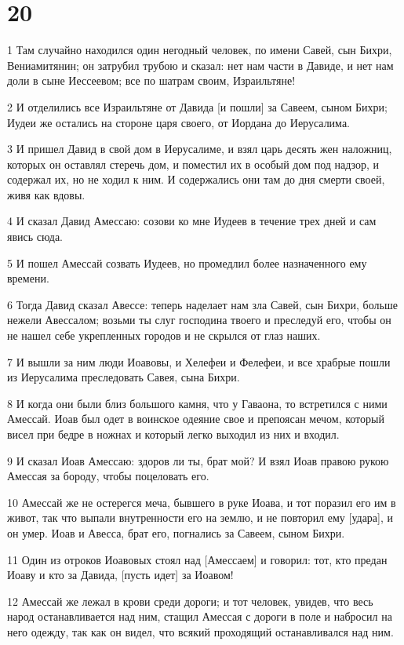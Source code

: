 \chapter{20}

\par 1 Там случайно находился один негодный человек, по имени Савей, сын Бихри, Вениамитянин; он затрубил трубою и сказал: нет нам части в Давиде, и нет нам доли в сыне Иессеевом; все по шатрам своим, Израильтяне!
\par 2 И отделились все Израильтяне от Давида [и пошли] за Савеем, сыном Бихри; Иудеи же остались на стороне царя своего, от Иордана до Иерусалима.
\par 3 И пришел Давид в свой дом в Иерусалиме, и взял царь десять жен наложниц, которых он оставлял стеречь дом, и поместил их в особый дом под надзор, и содержал их, но не ходил к ним. И содержались они там до дня смерти своей, живя как вдовы.
\par 4 И сказал Давид Амессаю: созови ко мне Иудеев в течение трех дней и сам явись сюда.
\par 5 И пошел Амессай созвать Иудеев, но промедлил более назначенного ему времени.
\par 6 Тогда Давид сказал Авессе: теперь наделает нам зла Савей, сын Бихри, больше нежели Авессалом; возьми ты слуг господина твоего и преследуй его, чтобы он не нашел себе укрепленных городов и не скрылся от глаз наших.
\par 7 И вышли за ним люди Иоавовы, и Хелефеи и Фелефеи, и все храбрые пошли из Иерусалима преследовать Савея, сына Бихри.
\par 8 И когда они были близ большого камня, что у Гаваона, то встретился с ними Амессай. Иоав был одет в воинское одеяние свое и препоясан мечом, который висел при бедре в ножнах и который легко выходил из них и входил.
\par 9 И сказал Иоав Амессаю: здоров ли ты, брат мой? И взял Иоав правою рукою Амессая за бороду, чтобы поцеловать его.
\par 10 Амессай же не остерегся меча, бывшего в руке Иоава, и тот поразил его им в живот, так что выпали внутренности его на землю, и не повторил ему [удара], и он умер. Иоав и Авесса, брат его, погнались за Савеем, сыном Бихри.
\par 11 Один из отроков Иоавовых стоял над [Амессаем] и говорил: тот, кто предан Иоаву и кто за Давида, [пусть идет] за Иоавом!
\par 12 Амессай же лежал в крови среди дороги; и тот человек, увидев, что весь народ останавливается над ним, стащил Амессая с дороги в поле и набросил на него одежду, так как он видел, что всякий проходящий останавливался над ним.

